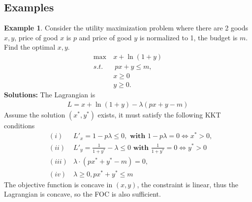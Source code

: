 \documentclass[11pt,a4paper]{book}
\theoremstyle{definition}\newtheorem{definition}{Definition}
\theoremstyle{definition}\newtheorem{fact}{Fact}
\theoremstyle{definition}\newtheorem{remark}{Remark}
\theoremstyle{definition}\newtheorem{ex}{Ex.}
\theoremstyle{definition}\newtheorem{project}{Project}
\theoremstyle{definition}\newtheorem{problem}{Problem}
\theoremstyle{definition}\newtheorem{example}{Example}
\numberwithin{theorem}{section}
\numberwithin{corollary}{chapter}
\numberwithin{assumption}{chapter}
\numberwithin{definition}{chapter}
\numberwithin{prop}{chapter}
\numberwithin{notation}{chapter}
\numberwithin{problem}{chapter}
\numberwithin{example}{chapter}
\numberwithin{fact}{chapter}
\numberwithin{ex}{chapter}
\begin{document}
	\subsection{Examples}
	\begin{example} \label{example:kkt2}
		Consider the utility maximization problem where there are 2 goods $x,y$, price of good $x$ is $p$ and price of good $y$ is normalized to 1, the budget is $m$. Find the optimal $x,y$.
		\begin{align*}
			\max \ & x + \ln(1+y)                                         \\
			s.t. &\ px + y \leq m, \\
			& x \geq 0 \\
			& y \geq 0.                                      
		\end{align*}
		\textbf{Solutions:}
		The Lagrangian is
		\begin{align*}
			L = x + \ln(1+y) - \lambda (px + y - m)
		\end{align*}
		Assume the solution $(x^*,y^*)$ exists, it must satisfy the following KKT conditions
		\begin{align*}
			&(i) & L'_x = 1 - p \lambda \leq 0, \textbf{ with }  1- p\lambda = 0 \iff x^* > 0,  \\
			&(ii) & L'_y = \frac{1}{1+y^*} -\lambda \leq 0 \textbf{ with } \frac{1}{1+y^*} = 0 \iff y^* > 0 \\
			&(iii) & \lambda \cdot (px^* + y^* - m) = 0, \\
			& (iv) & \lambda \geq 0, px^* + y^* \leq m
		\end{align*}
		The objective function is concave in $(x,y)$, the constraint is linear, thus the Lagrangian is concave, so the FOC is also sufficient.
		

\end{example}
\end{document}
